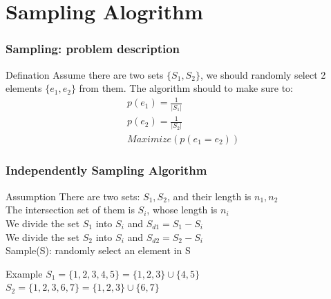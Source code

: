 \documentclass[notheorems, aspectratio=54]{beamer}
\begin{document}
\section{Sampling Alogrithm}
\begin{frame}
    \frametitle{Sampling: problem description}
    \begin{block}{Defination}
        Assume there are two sets $\{S_1, S_2\}$, we should randomly select 2 elements $\{e_1, e_2\}$ from them.
        The algorithm should to make sure to:
        \begin{equation}
            \begin{aligned}
                & p(e_1) = \frac{1}{|S_1|}\\
                & p(e_2) = \frac{1}{|S_2|}\\
                & Maximize ( { p(e_1 = e_2) } )
            \end{aligned}
            \end{equation}
    \end{block}
    
\end{frame}

\begin{frame}
    \frametitle{Independently Sampling Algorithm}
    \begin{block}{Assumption}
        There are two sets: $S_1, S_2$, and their length is $n_1, n_2$ \\
        The intersection set of them is $S_i$, whose length is $n_i$ \\
        We divide the set $S_1$ into $S_i$ and $S_{d1} = S_1 - S_i$ \\
        We divide the set $S_2$ into $S_i$ and $S_{d2} = S_2 - S_i$ \\
        Sample(S): randomly select an element in S
    \end{block}
    
    \begin{block}{Example}
        $S_1 = \{1,2,3,4,5\} = \{1,2,3\} \cup \{4,5\}$ \\
        $S_2 = \{1,2,3,6,7\} = \{1,2,3\} \cup \{6,7\}$
    \end{block}
    
\end{frame}
\end{document}

